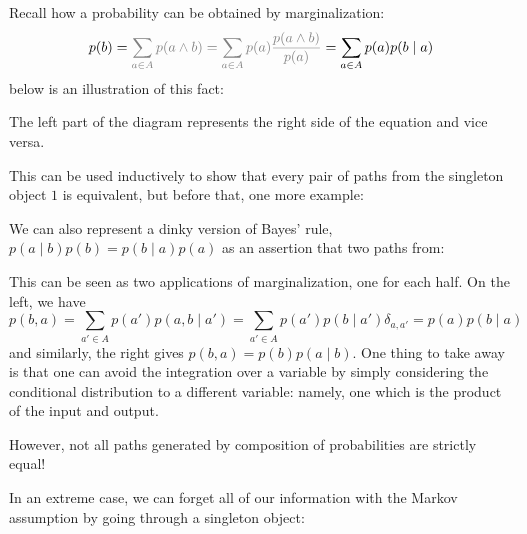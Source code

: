 \documentclass{article}
\begin{document}
	
	\begin{example}[Marginalization] \label{ex:margin}
		Recall how a probability can be obtained by marginalization:
		\[ p(b) = {\color{gray}\sum_{a \in A} p(a \land b) = \sum_{a \in A} p(a) \frac{p(a\land b)}{p(a)} }= \sum_{a \in A} p(a) p(b\mid a) \]
		below is an illustration of this fact:
		\begin{center}
		\end{center}
		The left part of the diagram represents the right side of the equation and vice versa. 
	\end{example} 

	This can be used inductively to show that every pair of paths from the singleton object $1$ is equivalent, but before that, one more example:
	
	\begin{example} \label{ex:bayesrule}
		We can also represent a dinky version of Bayes' rule, $p(a \mid b) p(b) = p(b \mid a) p(a)$ as an assertion that two paths from:
		\begin{center}
		\end{center}
		This can be seen as two applications of marginalization, one for each half. On the left, we have
		\[ p(b, a) = \sum_{a' \in A} p(a')p(a,b \mid a') = \sum_{a' \in A} p(a') p(b \mid a') \delta_{a,a'} = p(a) p(b \mid a) \]
		and similarly, the right gives $p(b,a) = p(b) p(a \mid b)$. One thing to take away is that one can avoid the integration over a variable by simply considering the conditional distribution to a different variable: namely, one which is the product of the input and output. 
	\end{example}
	
	
	However, not all paths generated by composition of probabilities are strictly equal! 
	
	\begin{example}
		In an extreme case, we can forget all of our information with the Markov assumption by going through a singleton object:
		
		\begin{center}
		\end{center}
	\end{example}
	
\end{document}
